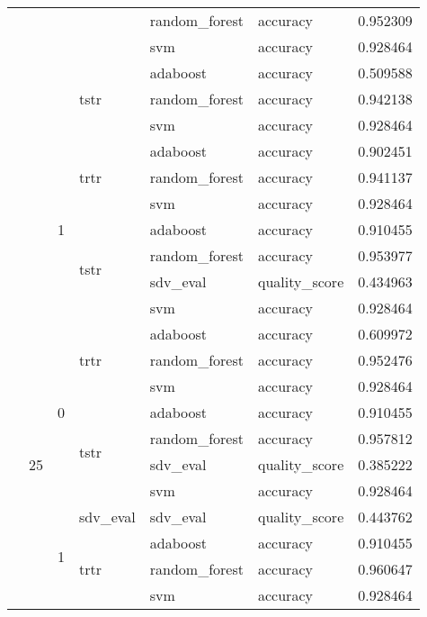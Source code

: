 \begin{longtable}{llllllr}
\cline{5-7}
 &  &  &  & random_forest & accuracy & 0.952309 \\
\cline{5-7}
 &  &  &  & svm & accuracy & 0.928464 \\
\cline{4-7} \cline{5-7}
 &  &  & \multirow[t]{3}{*}{tstr} & adaboost & accuracy & 0.509588 \\
\cline{5-7}
 &  &  &  & random_forest & accuracy & 0.942138 \\
\cline{5-7}
 &  &  &  & svm & accuracy & 0.928464 \\
\cline{3-7} \cline{4-7} \cline{5-7}
 &  & \multirow[t]{7}{*}{1} & \multirow[t]{3}{*}{trtr} & adaboost & accuracy & 0.902451 \\
\cline{5-7}
 &  &  &  & random_forest & accuracy & 0.941137 \\
\cline{5-7}
 &  &  &  & svm & accuracy & 0.928464 \\
\cline{4-7} \cline{5-7}
 &  &  & \multirow[t]{4}{*}{tstr} & adaboost & accuracy & 0.910455 \\
\cline{5-7}
 &  &  &  & random_forest & accuracy & 0.953977 \\
\cline{5-7}
 &  &  &  & sdv_eval & quality_score & 0.434963 \\
\cline{5-7}
 &  &  &  & svm & accuracy & 0.928464 \\
\cline{2-7} \cline{3-7} \cline{4-7} \cline{5-7}
 & \multirow[t]{14}{*}{25} & \multirow[t]{7}{*}{0} & \multirow[t]{3}{*}{trtr} & adaboost & accuracy & 0.609972 \\
\cline{5-7}
 &  &  &  & random_forest & accuracy & 0.952476 \\
\cline{5-7}
 &  &  &  & svm & accuracy & 0.928464 \\
\cline{4-7} \cline{5-7}
 &  &  & \multirow[t]{4}{*}{tstr} & adaboost & accuracy & 0.910455 \\
\cline{5-7}
 &  &  &  & random_forest & accuracy & 0.957812 \\
\cline{5-7}
 &  &  &  & sdv_eval & quality_score & 0.385222 \\
\cline{5-7}
 &  &  &  & svm & accuracy & 0.928464 \\
\cline{3-7} \cline{4-7} \cline{5-7}
 &  & \multirow[t]{7}{*}{1} & sdv_eval & sdv_eval & quality_score & 0.443762 \\
\cline{4-7} \cline{5-7}
 &  &  & \multirow[t]{3}{*}{trtr} & adaboost & accuracy & 0.910455 \\
\cline{5-7}
 &  &  &  & random_forest & accuracy & 0.960647 \\
\cline{5-7}
 &  &  &  & svm & accuracy & 0.928464 \\

\end{longtable}
